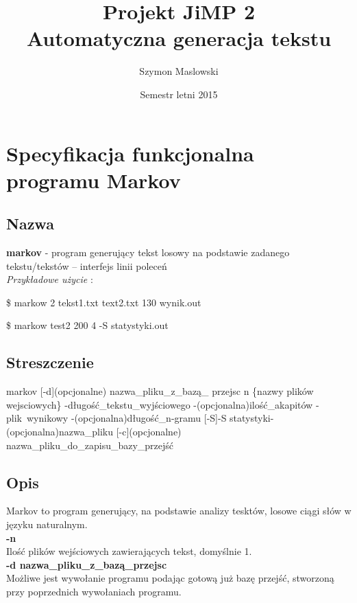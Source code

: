 \documentclass{article}
\title{Projekt JiMP 2\\\textbf{Automatyczna generacja tekstu}}
\author{Szymon Maslowski }
\date{Semestr letni 2015}
\begin{document}
\maketitle

\section*{Specyfikacja funkcjonalna programu Markov}

\subsection*{Nazwa}

\textbf{markov} - program generujący tekst losowy na podstawie zadanego tekstu/tekstów -- interfejs linii poleceń\\


\textit{Przykładowe użycie} :

\$ markow 2 tekst1.txt text2.txt 130 wynik.out 

\$ markow test2 200 4 -S statystyki.out
	

\subsection*{Streszczenie}
\par markov [-d](opcjonalne) nazwa\_pliku\_z\_bazą\_ przejsc n \{nazwy plików wejsciowych\} -długość\_tekstu\_wyjściowego  -(opcjonalna)ilość\_akapitów -plik\ wynikowy  -(opcjonalna)długość\_n-gramu  [-S]{-S statystyki}-(opcjonalna)nazwa\_pliku [-c](opcjonalne) nazwa\_pliku\_do\_zapisu\_bazy\_przejść
	
\subsection*{Opis}
\par Markov to program generujący, na podstawie analizy tesktów, losowe ciągi słów w języku naturalnym. \\
		
		\textbf{-n}\\
		
			Ilość plików wejściowych zawierających tekst, domyślnie 1.\\
		
		\textbf{-d  nazwa\_pliku\_z\_bazą\_przejsc}\\
		
		    Możliwe jest wywołanie programu podając gotową już bazę przejść, stworzoną przy poprzednich wywołaniach programu.\\
		
\end{document}
